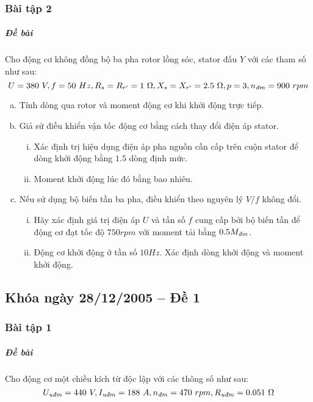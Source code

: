 \documentclass[12pt,a4paper]{article}
\begin{document}
\subsubsection{Bài tập 2}
\subparagraph{Đề bài} Cho động cơ không đồng bộ ba pha rotor lồng sóc, stator đấu $Y$ với các tham số như sau: $$ U = 380 \unit{V}, f = 50 \unit{Hz}, R_s = R_{r^ \prime}  = 1 \unit{\Omega}, X_s = X_{r^ \prime}  = 2.5 \unit{\Omega}, p = 3, \vitalic{n} = 900\unit{rpm}$$
\begin{enumerate}[a.]
\item Tính dòng qua rotor và moment động cơ khi khởi động trực tiếp.
\item Giả sử điều khiển vận tốc động cơ bằng cách thay đổi điện áp stator.
\begin{enumerate}[i.]
\item Xác định trị hiệu dụng điện áp pha nguồn cần cấp trên cuộn stator để dòng khởi động bằng $1.5$ dòng định mức.
\item Moment khởi động lúc đó bằng bao nhiêu.
\end{enumerate}
\item Nếu sử dụng bộ biến tần ba pha, điều khiển theo nguyên lý $V/f$ không đổi.
\begin{enumerate}[i.]
\item Hãy xác định giá trị điện áp $U$ và tần số $f$ cung cấp bởi bộ biến tần để động cơ đạt tốc độ $750 \unit{rpm}$ với moment tải bằng $0.5 \vitalic{M}$.
\item Động cơ khởi động ở tần số $10 \unit{Hz}$. Xác định dòng khởi động và moment khởi động.
\end{enumerate}
\end{enumerate}
\subsection{Khóa ngày 28/12/2005 -- Đề 1}
\subsubsection{Bài tập 1}
\subparagraph{Đề bài} Cho động cơ một chiều kích từ độc lập với các thông số như sau: $$\vqitalic{U} = 440 \unit{V}, \vqitalic{I} = 188 \unit{A}, \vitalic{n} = 470 \unit{rpm}, \vqitalic{R} = 0.051 \unit{\Omega}$$
\end{document}
